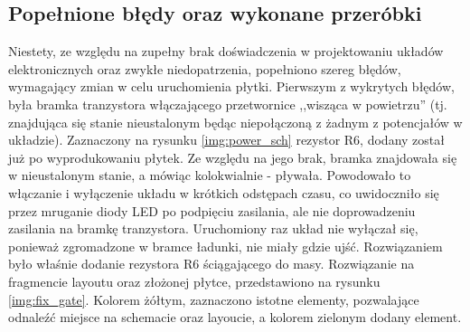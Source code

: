 \subsection{Popełnione błędy oraz wykonane przeróbki}
\label{sub:mistakes}
Niestety, ze względu na zupełny brak doświadczenia w projektowaniu układów elektronicznych oraz zwykłe niedopatrzenia, popełniono szereg błędów, wymagający zmian w celu uruchomienia płytki.
\newline \newline
Pierwszym z wykrytych błędów, była bramka tranzystora włączającego przetwornice ,,wisząca w powietrzu'' (tj. znajdująca się stanie nieustalonym będąc niepołączoną z żadnym z potencjałów w układzie). Zaznaczony na rysunku \ref{img:power_sch} rezystor R6, dodany został już po wyprodukowaniu płytek. Ze względu na jego brak, bramka znajdowała się w nieustalonym stanie, a mówiąc kolokwialnie - pływała. Powodowało to włączanie i wyłączenie układu w krótkich odstępach czasu, co uwidoczniło się przez mruganie diody LED po podpięciu zasilania, ale nie doprowadzeniu zasilania na bramkę tranzystora. Uruchomiony raz układ nie wyłączał się, ponieważ zgromadzone w bramce ładunki, nie miały gdzie ujść. Rozwiązaniem było właśnie dodanie rezystora R6 ściągającego do masy. Rozwiązanie na fragmencie layoutu oraz złożonej płytce, przedstawiono na rysunku \ref{img:fix_gate}. Kolorem żółtym, zaznaczono istotne elementy, pozwalające odnaleźć miejsce na schemacie oraz layoucie, a kolorem zielonym dodany element.

